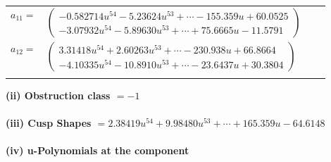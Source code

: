 \documentclass[1p]{elsarticle_modified}
\theoremstyle{definition}
\begin{document}
\begin{tabular}{m{7pt} m{180pt} m{7pt} m{180pt} }
\flushright $a_{11}=$&$\begin{pmatrix}-0.582714 u^{54}-5.23624 u^{53}+\cdots-155.359 u+60.0525\\-3.07932 u^{54}-5.89630 u^{53}+\cdots+75.6665 u-11.5791\end{pmatrix}$ \\
\flushright $a_{12}=$&$\begin{pmatrix}3.31418 u^{54}+2.60263 u^{53}+\cdots-230.938 u+66.8664\\-4.10335 u^{54}-10.8910 u^{53}+\cdots-23.6437 u+30.3804\end{pmatrix}$\\&\end{tabular}
\flushleft \textbf{(ii) Obstruction class $= -1$}\\~\\
\flushleft \textbf{(iii) Cusp Shapes $= 2.38419 u^{54}+9.98480 u^{53}+\cdots+165.359 u-64.6148$}\\~\\
\newpage\renewcommand{\arraystretch}{1}
\flushleft \textbf{(iv) u-Polynomials at the component}\newline \\
\end{document}
